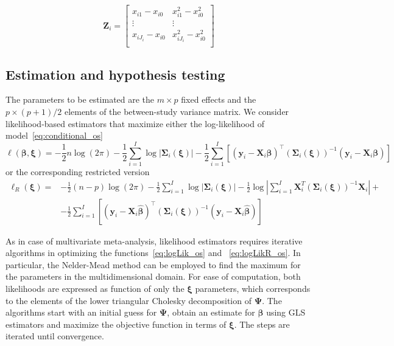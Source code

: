 \documentclass[11pt,a4paper,twoside,openany]{book}\usepackage{knitr}
\begin{document}
{\begin{equation*}
\mathbf{Z}_i =
	\begin{bmatrix}
		x_{i1} - x_{i0}  & x_{i1}^2 - x_{i0}^2 \\
		\vdots & \vdots \\
		x_{iJ_i} - x_{i0}  & x_{iJ_i}^2 - x_{i0}^2 \\
	\end{bmatrix}
\end{equation*} 

\subsection{Estimation and hypothesis testing}

The parameters to be estimated are the $m\times p$ fixed effects and the $p \times (p+1)/2$ elements of the between-study variance matrix. We consider likelihood-based estimators that maximize either the log-likelihood of model~\ref{eq:conditional_os}
\begin{equation}
\ell \left( \boldsymbol{\beta}, \boldsymbol{\xi} \right) = 
 -\frac{1}{2} n \log(2\pi)  -\frac{1}{2} \sum_{i=1}^I \log | \boldsymbol{\Sigma}_i \left( \boldsymbol{\xi} \right) |  -\frac{1}{2}\sum_{i=1}^I \left[ \left( \mathbf{y}_i -  \mathbf{X}_i \boldsymbol{\beta} \right)^\top \left( \boldsymbol{\Sigma}_i \left( \boldsymbol{\xi} \right) \right)^{-1} \left( \mathbf{y}_i -  \mathbf{X}_i \boldsymbol{\beta} \right) \right]
\label{eq:logLik_os}
\end{equation}
\noindent or the corresponding restricted version
\begin{equation}
\begin{split}
\ell_R \left( \boldsymbol{\xi} \right) = & 
 -\frac{1}{2} (n - p) \log(2\pi)  - \frac{1}{2} \sum_{i=1}^I \log | \boldsymbol{\Sigma}_i \left( \boldsymbol{\xi} \right) |  - \frac{1}{2} \log \left| \sum_{i=1}^I \mathbf{X}_i^T \left( \boldsymbol{\Sigma}_i \left( \boldsymbol{\xi} \right) \right)^{-1}  \mathbf{X}_i  \right| + \\
&-\frac{1}{2}\sum_{i=1}^I \left[ \left( \mathbf{y}_i -  \mathbf{X}_i \boldsymbol{\hat \beta} \right)^\top \left( \boldsymbol{\Sigma}_i \left( \boldsymbol{\xi} \right) \right)^{-1} \left( \mathbf{y}_i -  \mathbf{X}_i \boldsymbol{\hat \beta} \right) \right]
\end{split}
\label{eq:logLikR_os}
\end{equation}

As in case of multivariate meta-analysis, likelihood estimators requires iterative algorithms in optimizing the functions~\ref{eq:logLik_os} and ~\ref{eq:logLikR_os}. 
In particular, the Nelder-Mead method can be employed to find the maximum for the parameters in the multidimensional domain. For ease of computation, both likelihoods are expressed as function of only the $\boldsymbol{\xi}$ parameters, which corresponds to the elements of the lower triangular Cholesky decomposition of $\boldsymbol{\Psi}$. The algorithms start with an initial guess for $\boldsymbol{\Psi}$, obtain an estimate for $\boldsymbol{\beta}$ using GLS estimators and maximize the objective function in terms of $\boldsymbol{\xi}$. The steps are iterated until convergence.

}
\end{document}
